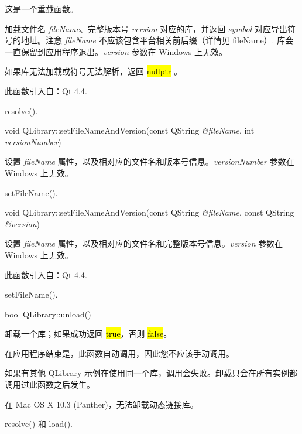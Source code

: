 这是一个重载函数。

加载文件名 \emph{fileName}、完整版本号 \emph{version} 对应的库，并返回 \emph{symbol} 对应导出符号的地址。注意 \emph{fileName} 不应该包含平台相关前后缀（详情见 fileName）. 库会一直保留到应用程序退出。\emph{version} 参数在 Windows 上无效。

如果库无法加载或符号无法解析，返回 \hl{nullptr} 。

此函数引入自：Qt 4.4.

\begin{seeAlso}
resolve().
\end{seeAlso}

void QLibrary::setFileNameAndVersion(const QString \emph{\&fileName}, int \emph{versionNumber})

设置 \emph{fileName} 属性，以及相对应的文件名和版本号信息。\emph{versionNumber} 参数在 Windows 上无效。



\begin{seeAlso}
setFileName().
\end{seeAlso}


void QLibrary::setFileNameAndVersion(const QString \emph{\&fileName}, const
QString \emph{\&version})

设置 \emph{fileName} 属性，以及相对应的文件名和完整版本号信息。\emph{version} 参数在 Windows 上无效。

此函数引入自：Qt 4.4.


\begin{seeAlso}
setFileName().
\end{seeAlso}


bool QLibrary::unload()

卸载一个库；如果成功返回 \hl{true}，否则 \hl{false}。

在应用程序结束是，此函数自动调用，因此您不应该手动调用。

如果有其他 QLibrary 示例在使用同一个库，调用会失败。卸载只会在所有实例都调用过此函数之后发生。

\begin{notice}
在 Mac OS X 10.3 (Panther)，无法卸载动态链接库。
\end{notice}

\begin{seeAlso}
resolve() 和 load().
\end{seeAlso}
